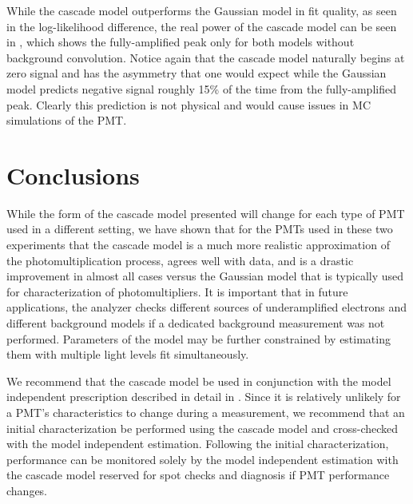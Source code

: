 While the cascade model outperforms the Gaussian model in fit quality, as seen in the log-likelihood difference, the real power of the cascade model can be seen in , which shows the fully-amplified peak only for both models without background convolution.  Notice again that the cascade model naturally begins at zero signal and has the asymmetry that one would expect while the Gaussian model predicts negative signal roughly 15\% of the time from the fully-amplified peak.  Clearly this prediction is not physical and would cause issues in MC simulations of the PMT.



\section{Conclusions}


While the form of the cascade model presented will change for each type of PMT used in a different setting, we have shown that for the PMTs used in these two experiments that the cascade model is a much more realistic approximation of the photomultiplication process, agrees well with data, and is a drastic improvement in almost all cases versus the Gaussian model that is typically used for characterization of photomultipliers.  It is important that in future applications, the analyzer checks different sources of underamplified electrons and different background models if a dedicated background measurement was not performed.  Parameters of the model may be further constrained by estimating them with multiple light levels fit simultaneously.

We recommend that the cascade model be used in conjunction with the model independent prescription described in detail in .  Since it is relatively unlikely for a PMT's characteristics to change during a measurement, we recommend that an initial characterization be performed using the cascade model and cross-checked with the model independent estimation.  Following the initial characterization, performance can be monitored solely by the model independent estimation with the cascade model reserved for spot checks and diagnosis if PMT performance changes.




